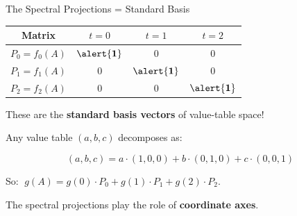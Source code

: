 \documentclass[10pt]{beamer}
\theoremstyle{definition}
\newcommand{\x}[1]{\alert{\textbf{#1}}}
\begin{document}
%
\begin{frame}{The Spectral Projections = Standard Basis}

\begin{center}
\renewcommand{\arraystretch}{1.5}
\begin{tabular}{c|ccc}
Matrix & $t = 0$ & $t = 1$ & $t = 2$ \\
\hline
$P_0 = f_0(A)$ & $\x{1}$ & $0$ & $0$ \\
$P_1 = f_1(A)$ & $0$ & $\x{1}$ & $0$ \\
$P_2 = f_2(A)$ & $0$ & $0$ & $\x{1}$
\end{tabular}
\end{center}

\vfill

These are the \x{standard basis vectors} of value-table space!

\vfill\pause

Any value table $(a, b, c)$ decomposes as:

$$(a, b, c) = a \cdot (1,0,0) + b \cdot (0,1,0) + c \cdot (0,0,1)$$

\vfill

So: $\;g(A) = g(0) \cdot P_0 + g(1) \cdot P_1 + g(2) \cdot P_2$.

\vfill

The spectral projections play the role of \x{coordinate axes}.

\end{frame}
\end{document}
